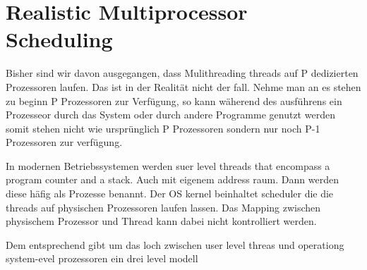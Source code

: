 \section{Realistic Multiprocessor Scheduling}

Bisher sind wir davon ausgegangen, dass Mulithreading threads auf P dedizierten Prozessoren laufen. Das ist in der Realität nicht der fall. Nehme man an es stehen zu beginn P Prozessoren zur Verfügung, so kann wäherend des ausführens ein Prozesseor durch das System oder durch andere Programme genutzt werden somit stehen nicht wie ursprünglich P Prozessoren sondern nur noch P-1 Prozessoren zur verfügung.

In modernen Betriebssystemen werden suer level threads that encompass a program counter and a stack. Auch mit eigenem address raum. Dann werden diese häfig als Prozesse benannt. Der OS kernel beinhaltet scheduler die die threads auf physischen Prozessoren laufen lassen. Das Mapping zwischen physischem Prozessor und Thread kann dabei nicht kontrolliert werden.

Dem entsprechend gibt um das loch zwischen user level threas und operationg system-evel prozessoren ein drei level modell